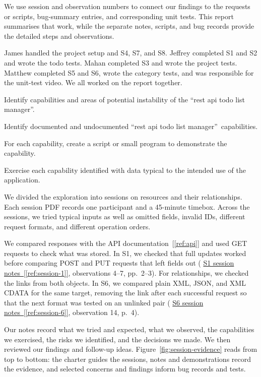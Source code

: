 \documentclass[12pt,letterpaper]{article}
\newcommand{\NotesRef}[1]{%
  \hyperref[ref:session-#1]{S#1 session notes~[\ref*{ref:session-#1}]}}
\begin{document}
We use session and observation numbers to connect our findings to the requests
or scripts, bug-summary entries, and corresponding unit tests. This report
summarises that work, while the separate notes, scripts, and bug records provide
the detailed steps and observations.

James handled the project setup and S4, S7, and S8. Jeffrey completed S1 and S2
and wrote the todo tests. Mahan completed S3 and wrote the project tests.
Matthew completed S5 and S6, wrote the category tests, and was responsible for
the unit-test video. We all worked on the report together.

\NewContentPage
{}

\begin{Charter}
Identify capabilities and areas of potential instability of the
\textquotedblleft rest api todo list manager\textquotedblright.

Identify documented and undocumented
\textquotedblleft rest api todo list manager\textquotedblright\ capabilities.

For each capability, create a script or small program to demonstrate
the capability.

Exercise each capability identified with data typical to the intended
use of the application.
\end{Charter}

We divided the exploration into sessions on resources and their relationships.
Each session PDF records one participant and a 45-minute timebox. Across the
sessions, we tried typical inputs as well as omitted fields, invalid IDs,
different request formats, and different operation orders.

We compared responses with the API documentation~[\ref{ref:api}] and used GET
requests to check what was stored. In S1, we checked that full updates worked
before comparing POST and PUT requests that left fields out
(\NotesRef{1}, observations 4--7, pp.~2--3). For relationships, we checked the links
from both objects. In S6, we compared plain XML, JSON, and XML CDATA for the same
target, removing the link after each successful request so that the next format
was tested on an unlinked pair (\NotesRef{6}, observation 14, p.~4).

Our notes record what we tried and expected, what we observed, the capabilities
we exercised, the risks we identified, and the decisions we made. We then
reviewed our findings and follow-up ideas.
Figure~\ref{fig:session-evidence} reads from top to bottom: the charter guides the
sessions, notes and demonstrations record the evidence, and selected concerns
and findings inform bug records and tests.
\end{document}

